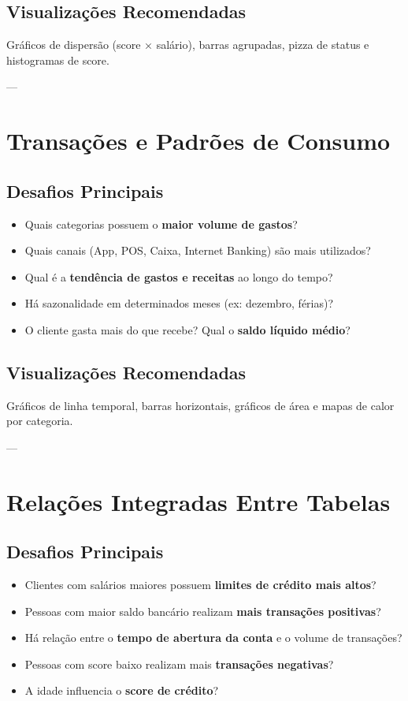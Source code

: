 \begin{appendices}
\subsection*{Visualizações Recomendadas}
Gráficos de dispersão (score × salário), barras agrupadas, pizza de status e histogramas de score.

---

\section{Transações e Padrões de Consumo}

\subsection*{Desafios Principais}
\begin{itemize}
  \item Quais categorias possuem o \textbf{maior volume de gastos}?
  \item Quais canais (App, POS, Caixa, Internet Banking) são mais utilizados?
  \item Qual é a \textbf{tendência de gastos e receitas} ao longo do tempo?
  \item Há sazonalidade em determinados meses (ex: dezembro, férias)?
  \item O cliente gasta mais do que recebe? Qual o \textbf{saldo líquido médio}?
\end{itemize}

\subsection*{Visualizações Recomendadas}
Gráficos de linha temporal, barras horizontais, gráficos de área e mapas de calor por categoria.

---

\section{Relações Integradas Entre Tabelas}

\subsection*{Desafios Principais}
\begin{itemize}
  \item Clientes com salários maiores possuem \textbf{limites de crédito mais altos}?
  \item Pessoas com maior saldo bancário realizam \textbf{mais transações positivas}?
  \item Há relação entre o \textbf{tempo de abertura da conta} e o volume de transações?
  \item Pessoas com score baixo realizam mais \textbf{transações negativas}?
  \item A idade influencia o \textbf{score de crédito}?
\end{itemize}


\end{appendices}
